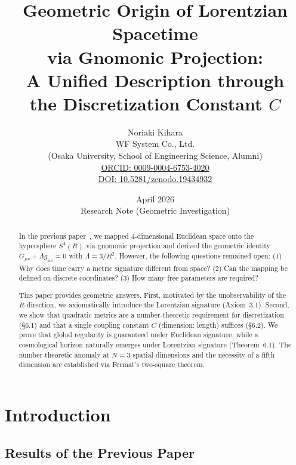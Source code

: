 \documentclass[12pt,a4paper]{article}
\title{\textbf{Geometric Origin of Lorentzian Spacetime\\via Gnomonic Projection:\\A Unified Description through\\the Discretization Constant $C$}}
\author{Noriaki Kihara\\
\small WF System Co., Ltd.\\
\small (Osaka University, School of Engineering Science, Alumni)\\
\small \href{https://orcid.org/0009-0004-6753-4020}{ORCID: 0009-0004-6753-4020}\\
\small \href{https://doi.org/10.5281/zenodo.19434932}{DOI: 10.5281/zenodo.19434932}}
\date{April 2026\\[5pt]\small Research Note (Geometric Investigation)}
\begin{document}
\maketitle

\begin{abstract}
In the previous paper~\cite{Paper1}, we mapped 4-dimensional Euclidean space onto the hypersphere $S^4(R)$ via gnomonic projection and derived the geometric identity $G_{\mu\nu} + \Lambda g_{\mu\nu} = 0$ with $\Lambda = 3/R^2$. However, the following questions remained open: (1) Why does time carry a metric signature different from space? (2) Can the mapping be defined on discrete coordinates? (3) How many free parameters are required?

This paper provides geometric answers. First, motivated by the unobservability of the $R$-direction, we axiomatically introduce the Lorentzian signature (Axiom~3.1). Second, we show that quadratic metrics are a number-theoretic requirement for discretization (\S6.1) and that a single coupling constant $C$ (dimension: length) suffices (\S6.2). We prove that global regularity is guaranteed under Euclidean signature, while a cosmological horizon naturally emerges under Lorentzian signature (Theorem~6.1). The number-theoretic anomaly at $N=3$ spatial dimensions and the necessity of a fifth dimension are established via Fermat's two-square theorem.
\end{abstract}

\tableofcontents

\section{Introduction}

\subsection{Results of the Previous Paper}
\end{document}
